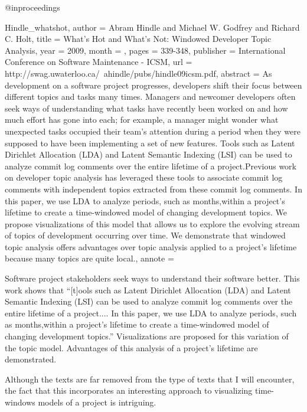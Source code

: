 @inproceedings{Hindle_whatshot,
	author = {Abram Hindle and Michael W. Godfrey and Richard C. Holt},
	title = {What's Hot and What's Not: Windowed Developer Topic Analysis},
	year = {2009},
	month = {},
	pages = {339-348},
	publisher = {International Conference on Software Maintenance - ICSM},
	url = {http://swag.uwaterloo.ca/~ahindle/pubs/hindle09icsm.pdf},
	abstract = {As development on a software project progresses, developers shift their focus between different topics and tasks many times. Managers and newcomer developers often seek ways of understanding what tasks have recently been worked on and how much effort has gone into each; for example, a manager might wonder what unexpected tasks occupied their team’s attention during a period when they were supposed to have been implementing a set of new features. Tools such as Latent Dirichlet Allocation (LDA) and Latent Semantic Indexing (LSI) can be used to analyze commit log comments over the entire lifetime of a project.Previous work on developer topic analysis has leveraged these tools to associate commit log comments with independent topics extracted from these commit log comments. In this paper, we use LDA to analyze periods, such as months,within a project’s lifetime to create a time-windowed model of changing development topics. We propose visualizations of this model that allows us to explore the evolving stream of topics of development occurring over time. We demonstrate that windowed topic analysis offers advantages over topic analysis applied to a project’s lifetime because many topics are quite local.},
	annote = {Software project stakeholders seek ways to understand their software better. This work shows that ``[t]ools such as Latent Dirichlet Allocation (LDA) and Latent Semantic Indexing (LSI) can be used to analyze commit log comments over the entire lifetime of a project.... In this paper, we use LDA to analyze periods, such as months,within a project’s lifetime to create a time-windowed model of changing development topics.'' Visualizations are proposed for this variation of the topic model. Advantages of this analysis of a project's lifetime are demonstrated.

Although the texts are far removed from the type of texts that I will encounter, the fact that this incorporates an interesting approach to visualizing time-windows models of a project is intriguing.}
}

